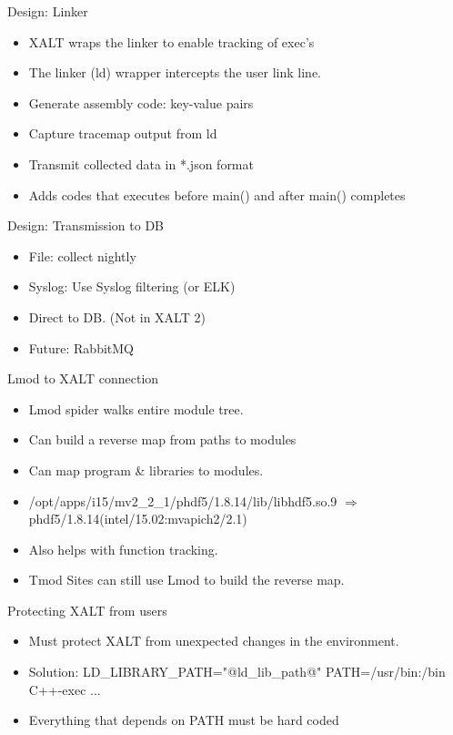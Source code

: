 \documentclass{beamer}
\begin{document}
\begin{frame}{Design: Linker}
  \begin{itemize}
    \item XALT wraps the linker to enable tracking of exec's
    \item The linker (ld) wrapper intercepts the user link line.
    \item Generate assembly code: key-value pairs
    \item Capture tracemap output from ld
    \item Transmit collected data in *.json format
    \item Adds codes that executes before main() and after main() completes
  \end{itemize}
\end{frame}

\begin{frame}{Design: Transmission to DB}
  \begin{itemize}
    \item File: collect nightly
    \item Syslog: Use Syslog filtering (or ELK)
    \item Direct to DB. (Not in XALT 2)
    \item Future: RabbitMQ
  \end{itemize}
\end{frame}

\begin{frame}{Lmod to XALT connection}
  \begin{itemize}
    \item Lmod spider walks entire module tree.
    \item Can build a reverse map from paths to modules
    \item Can map program \& libraries to modules.
    \item /opt/apps/i15/mv2\_2\_1/phdf5/1.8.14/lib/libhdf5.so.9
      $\Rightarrow$ phdf5/1.8.14(intel/15.02:mvapich2/2.1)
    \item Also helps with function tracking.
    \item Tmod Sites can still use Lmod to build the reverse map.
  \end{itemize}
\end{frame}

\begin{frame}{Protecting XALT from users}
    \begin{itemize}
      \item Must protect XALT from unexpected changes in the environment.
      \item Solution: LD\_LIBRARY\_PATH="@ld\_lib\_path@"
        PATH=/usr/bin:/bin C++-exec ...
      \item Everything that depends on PATH must be hard coded
    \end{itemize}
\end{frame}
\end{document}
